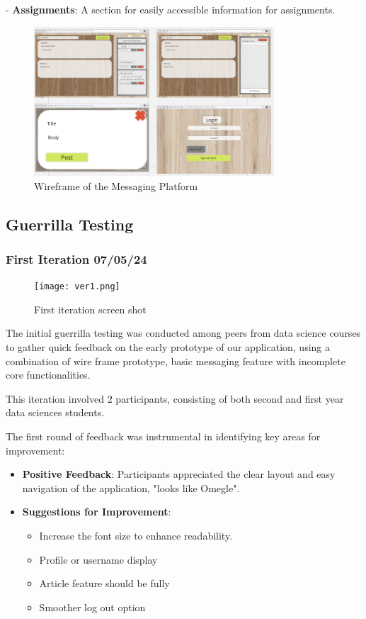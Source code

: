 \documentclass[12pt,a4paper]{article}
\newcounter{subsubsubsection}[subsubsection]
\begin{document}
- \textbf{Assignments}: A section for easily accessible information for assignments.

\begin{figure}[H]
\centering
\includegraphics[width=0.8\textwidth]{wireframe.png}
\caption{Wireframe of the Messaging Platform}
\label{fig:wireframe}
\end{figure}

\subsection*{Guerrilla Testing}
\subsubsection*{First Iteration 07/05/24}

\begin{figure}[H]
\centering
\texttt{[image: ver1.png]} 
\caption{First iteration screen shot}
\label{fig:sitemap}
\end{figure}

The initial guerrilla testing was conducted among peers from data science courses to gather quick feedback on the early prototype of our application, using a combination of wire frame prototype, basic messaging feature with incomplete core functionalities. 

This iteration involved 2 participants, consisting of both second and first year data sciences students. 

The first round of feedback was instrumental in identifying key areas for improvement:
\begin{itemize}
    \item \textbf{Positive Feedback}: Participants appreciated the clear layout and easy navigation of the application, "looks like Omegle".
    \item \textbf{Suggestions for Improvement}:
    \begin{itemize}
        \item Increase the font size to enhance readability.
        \item Profile or username display
        \item Article feature should be fully 
        \item Smoother log out option
    \end{itemize}
\end{itemize}
\end{document}
